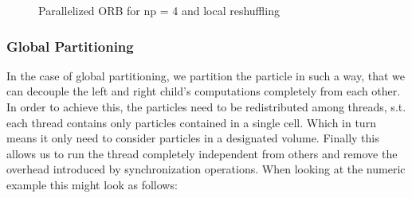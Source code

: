 \documentclass[]{article}
\begin{document}
\begin{figure}[H]
	\begin{center}
	\end{center}
	\caption{Parallelized ORB for np = 4 and local reshuffling}
	\label{fig:orb_parallel}
\end{figure}

\subsubsection{Global Partitioning}

In the case of global partitioning, we partition the particle in such a way, that we can decouple the left and right child's computations completely from each other. In order to achieve this, the particles need to be redistributed among threads, s.t. each thread contains only particles contained in a single cell. Which in turn means it only need to consider particles in a designated volume. Finally this allows us to run the thread completely independent from others and remove the overhead introduced by synchronization operations.
When looking at the numeric example this might look as follows:
\end{document}
